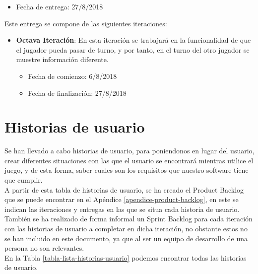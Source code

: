 \begin{itemize}
  \item Fecha de entrega: 27/8/2018
\end{itemize}

\hfill

Este entrega se compone de las siguientes iteraciones:

\begin{itemize}
  \item \textbf{Octava Iteración}:  En esta iteración se trabajará en la funcionalidad de que el jugador pueda pasar de turno, y por tanto, en el turno del otro jugador se muestre información diferente.

  \begin{itemize}
    \item Fecha de comienzo: 6/8/2018
    \item Fecha de finalización: 27/8/2018
  \end{itemize}
\end{itemize}


\section{Historias de usuario}
Se han llevado a cabo historias de usuario, para poniendonos en lugar del usuario, crear diferentes situaciones con las que el usuario se encontrará mientras utilice el juego, y de esta forma, saber cuales son los requisitos que nuestro software tiene que cumplir.\\

A partir de esta tabla de historias de usuario, se ha creado el Product Backlog que se puede encontrar en el Apéndice \ref{apendice-product-backlog}, en este se indican las iteraciones y entregas en las que se situa cada historia de usuario.\\

También se ha realizado de forma informal un Sprint Backlog para cada iteración con las historias de usuario a completar en dicha iteración, no obstante estos no se han incluido en este documento, ya que al ser un equipo de desarrollo de una persona no son relevantes.\\

En la Tabla \ref{tabla-lista-historias-usuario} podemos encontrar todas las historias de usuario.


